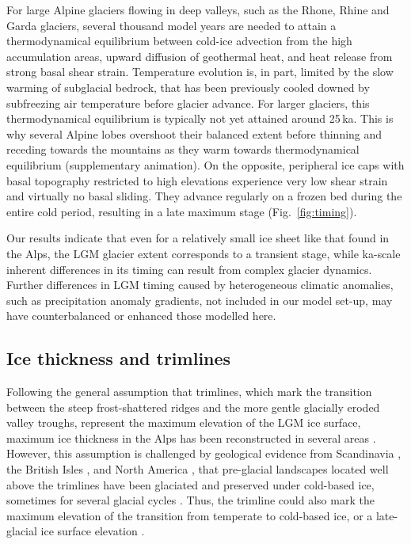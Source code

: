 \documentclass[tc, manuscript]{copernicus}
\begin{document}
    For large Alpine glaciers flowing in deep valleys, such as the Rhone,
    Rhine and Garda glaciers, several thousand model years are needed to attain
    a thermodynamical equilibrium between cold-ice advection from the high
    accumulation areas, upward diffusion of geothermal heat, and heat release
    from strong basal shear strain. Temperature evolution is, in part, limited
    by the slow warming of subglacial bedrock, that has been previously cooled
    downed by subfreezing air temperature before glacier advance.
    For larger glaciers, this thermodynamical equilibrium is typically not yet
    attained around 25\,ka. This is why several Alpine lobes overshoot their
    balanced extent before thinning and receding towards the mountains as they
    warm towards thermodynamical equilibrium (supplementary animation). On the
    opposite, peripheral ice caps with basal topography restricted to high
    elevations experience very low shear strain and virtually no basal sliding.
    They advance regularly on a frozen bed during the entire cold period,
    resulting in a late maximum stage (Fig.~\ref{fig:timing}).

    Our results indicate that even for a relatively small ice sheet like that
    found in the Alps, the LGM glacier extent corresponds to a transient
    stage, while ka-scale inherent differences in its timing can
    result from complex glacier dynamics. Further differences in LGM timing
    caused by heterogeneous climatic anomalies, such as precipitation
    anomaly gradients, not included in our model set-up, may have
    counterbalanced or enhanced those modelled here.


\subsection{Ice thickness and trimlines}
\label{sec:thickness}

    Following the general assumption that trimlines, which mark the transition
    between the steep frost-shattered ridges and the more gentle glacially eroded
    valley troughs, represent the maximum elevation of the LGM ice surface,
    maximum ice thickness in the Alps has been reconstructed in several areas
    \citep{Husen.1987, Florineth.1998, Florineth.Schluchter.1998,
    Kelly.etal.2004, Bini.etal.2009, Coutterand.2010, Cossart.etal.2012}.
    However, this assumption is challenged by geological evidence from
    Scandinavia \citep[e.g.,][]{Kleman.1994, Kleman.Borgstrom.1994},
    the British Isles \citep[e.g.,][]{Fabel.etal.2012}, and
    North America \citep[e.g.,][]{Kleman.etal.2010}, that pre-glacial landscapes
    located well above the trimlines have been glaciated and preserved
    under cold-based ice, sometimes for several glacial cycles
    \citep{Stroeven.etal.2002}. Thus, the trimline could also mark the
    maximum elevation of the transition from temperate to cold-based ice, or a
    late-glacial ice surface elevation \citep[Fig.~1, p.~403]{Coutterand.2010}.
\end{document}
